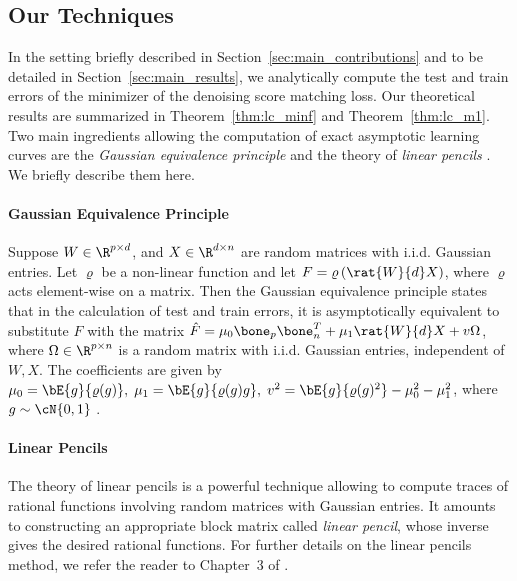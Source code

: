 \subsection{Our Techniques}
In the setting briefly described in Section~\ref{sec:main_contributions} and to be detailed in Section~\ref{sec:main_results}, we analytically compute the test and train errors of the minimizer of the denoising score matching loss. Our theoretical results are summarized in Theorem~\ref{thm:lc_minf} and Theorem~\ref{thm:lc_m1}. Two main ingredients allowing the computation of exact asymptotic learning curves are the \textit{Gaussian equivalence principle} \cite{gerace_generalisation_2020,goldt_gaussian_2022,hu_universality_2023} and the theory of \textit{linear pencils} \cite{far_spectra_2006,helton_applications_2018,adlam_neural_2020,bodin_random_2024}. We briefly describe them here.
\paragraph{Gaussian Equivalence Principle}
Suppose $W\in\R^{p\times d}$, and $X\in\R^{d\times n}$ are random matrices with i.i.d. Gaussian entries. Let $\varrho$ be a non-linear function and let $F=\varrho\left(\rat{W}{d}X\right)$, where $\varrho$ acts element-wise on a matrix. Then the Gaussian equivalence principle states that in the calculation of test and train errors, it is asymptotically equivalent to substitute $F$ with the matrix $\hat{F} = \mu_0\bone_p\bone_n^T+\mu_1\rat{W}{d}X+v\Omega$, where $\Omega\in\R^{p\times n}$ is a random matrix with i.i.d. Gaussian entries, independent of $W, X$. The coefficients are given by $\mu_0 = \bE{g}{\varrho(g)},\; \mu_1 = \bE{g}{\varrho(g)g},\; v^2 = \bE{g}{\varrho(g)^2}-\mu_0^2-\mu_1^2$, where $g\sim\cN{0,1}$ \;.
\paragraph{Linear Pencils} The theory of linear pencils is a powerful technique allowing to compute traces of rational functions involving random matrices with Gaussian entries. It amounts to constructing an appropriate block matrix called \textit{linear pencil}, whose inverse gives the desired rational functions. For further details on the linear pencils method, we refer the reader to Chapter~3 of \cite{bodin_random_2024} .

